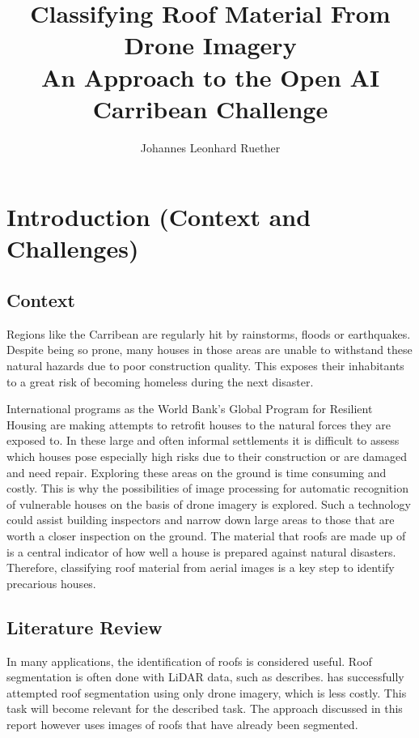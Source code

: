 \documentclass[11pt]{article}
\title{\bf{Classifying Roof Material From Drone Imagery} \\
 An Approach to the Open AI Carribean Challenge}
\author{Johannes Leonhard Ruether}
\begin{document}
	\maketitle
	
	\section{Introduction (Context and Challenges)}
	
	\subsection{Context}
	
	Regions like the Carribean are regularly hit by rainstorms, floods or earthquakes. Despite being so prone, many houses in those areas are unable to withstand these natural hazards due to poor construction quality. This exposes their inhabitants to a great risk of becoming homeless during the next disaster. 
	
	International programs as the World Bank's Global Program for Resilient Housing are making attempts to retrofit houses to the natural forces they are exposed to. In these large and often informal settlements it is difficult to assess which houses pose especially high risks due to their construction or are damaged and need repair. Exploring these areas on the ground is time consuming and costly. 
	This is why the possibilities of image processing for automatic recognition of vulnerable houses on the basis of drone imagery is explored. Such a technology could assist building inspectors and narrow down large areas to those that are worth a closer inspection on the ground. 
	The material that roofs are made up of is a central indicator of how well a house is prepared against natural disasters. Therefore, classifying roof material from aerial images is a key step to identify precarious houses. \\
	
	\subsection{Literature Review}
	
	In many applications, the identification of roofs is considered useful. Roof segmentation is often done with LiDAR data, such as \cite{Chen2012} describes. \cite{Soman2019} has successfully attempted roof segmentation using only drone imagery, which is less costly. This task will become relevant for the described task. The approach discussed in this report however uses images of roofs that have already been segmented.\\
	
\end{document}
